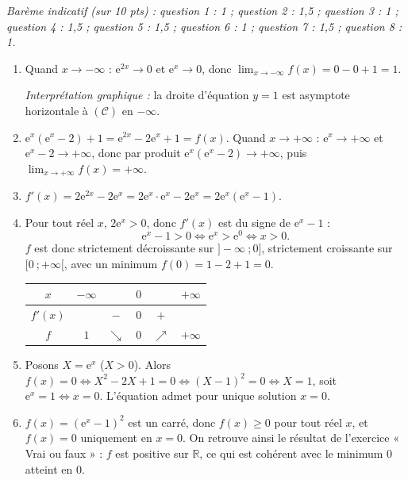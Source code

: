 \documentclass[11pt]{article}
\newcommand{\cle}[1]{{\popxbold\color{popdark}#1}}
\begin{document}
\begin{corrige}
\emph{Barème indicatif (sur 10 pts) : question 1 : 1 ; question 2 : 1,5 ; question 3 : 1 ; question 4 : 1,5 ; question 5 : 1,5 ; question 6 : 1 ; question 7 : 1,5 ; question 8 : 1.}

\begin{enumerate}
\item Quand $x \to -\infty$ : $\mathrm{e}^{2x} \to 0$ et $\mathrm{e}^x \to 0$, donc $\displaystyle\lim_{x \to -\infty} f(x) = 0 - 0 + 1 = 1$.

\emph{Interprétation graphique :} la droite d'équation $\boxed{y = 1}$ est \cle{asymptote horizontale} à $(\mathcal{C})$ en $-\infty$.
\item $\mathrm{e}^x\left(\mathrm{e}^x - 2\right) + 1 = \mathrm{e}^{2x} - 2\mathrm{e}^x + 1 = f(x)$. Quand $x \to +\infty$ : $\mathrm{e}^x \to +\infty$ et $\mathrm{e}^x - 2 \to +\infty$, donc par produit $\mathrm{e}^x(\mathrm{e}^x - 2) \to +\infty$, puis $\displaystyle\lim_{x \to +\infty} f(x) = +\infty$.
\item $f'(x) = 2\mathrm{e}^{2x} - 2\mathrm{e}^x = 2\mathrm{e}^x \cdot \mathrm{e}^x - 2\mathrm{e}^x = 2\mathrm{e}^x\left(\mathrm{e}^x - 1\right)$.
\item Pour tout réel $x$, $2\mathrm{e}^x > 0$, donc $f'(x)$ est du signe de $\mathrm{e}^x - 1$ :
\[ \mathrm{e}^x - 1 > 0 \iff \mathrm{e}^x > \mathrm{e}^0 \iff x > 0. \]
$f$ est donc strictement décroissante sur $]-\infty\ ; 0]$, strictement croissante sur $[0\ ; +\infty[$, avec un minimum $f(0) = 1 - 2 + 1 = 0$.
\begin{center}
\begin{tabular}{|c|ccccc|}\hline
$x$ & $-\infty$ & & $0$ & & $+\infty$ \\ \hline
$f'(x)$ & & $-$ & $0$ & $+$ & \\ \hline
$f$ & $1$ & $\searrow$ & $0$ & $\nearrow$ & $+\infty$ \\ \hline
\end{tabular}
\end{center}
\item Posons $X = \mathrm{e}^x$ ($X > 0$). Alors $f(x) = 0 \iff X^2 - 2X + 1 = 0 \iff (X - 1)^2 = 0 \iff X = 1$, soit $\mathrm{e}^x = 1 \iff x = 0$. L'équation admet pour unique solution $\boxed{x = 0}$.
\item $f(x) = \left(\mathrm{e}^x - 1\right)^2$ est un carré, donc $f(x) \geq 0$ pour tout réel $x$, et $f(x) = 0$ uniquement en $x = 0$. On retrouve ainsi le résultat de l'exercice « Vrai ou faux » : $f$ est positive sur $\mathbb{R}$, ce qui est cohérent avec le minimum $0$ atteint en $0$.

\end{enumerate}
\end{corrige}
\end{document}
